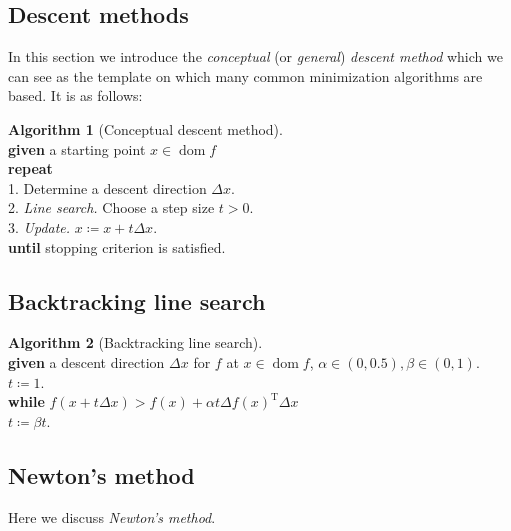 \documentclass[11pt]{amsart}
\theoremstyle{definition}
\newtheorem{algorithm}{Algorithm}[section]
\theoremstyle{remark}
\newcommand{\ind}{\hspace*{0.5cm}}
\newcommand{\transpose}{\text{T}}
\DeclareMathOperator{\domain}{dom}
\begin{document}
    \subsection{Descent methods}
        In this section we introduce the \emph{conceptual} (or \emph{general}) \emph{descent method} which we can see as the template on which many common minimization algorithms are based. It is as follows:

        \begin{algorithm}[Conceptual descent method]
        \label{a:conceptual_descent_method}\mbox{}\\
            \ind \textbf{given} a starting point $x \in \domain f$\\
            \ind \textbf{repeat} \\
            \ind\ind 1. Determine a descent direction $\Delta x$. \\
            \ind\ind 2. \emph{Line search.} Choose a step size $t > 0$. \\
            \ind\ind 3. \emph{Update.} $x \coloneqq x + t \Delta x$. \\
            \ind \textbf{until} stopping criterion is satisfied. \\
        \end{algorithm} 
    \subsection{Backtracking line search}
         \begin{algorithm}[Backtracking line search]
        \label{a:basic_conceptual_cp_alg}\mbox{}\\
            \ind \textbf{given} a descent direction $\Delta x$ for $f$ at $x \in \domain f$, $\alpha \in (0, 0.5), \beta \in (0, 1).$ \\
            \ind $t \coloneqq 1$. \\
            \ind \textbf{while} $f(x + t\Delta x) > f(x) + \alpha t \Delta f(x)^\transpose \Delta x$ \\
            \ind\ind $t \coloneqq \beta t$.
        \end{algorithm}        

    \subsection{Newton's method}
        Here we discuss \emph{Newton's method}.
\end{document}
